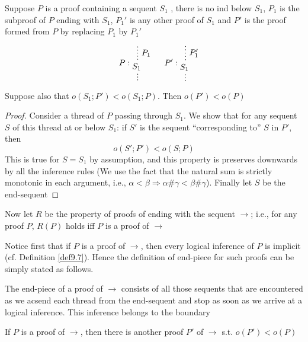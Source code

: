 \documentclass[11pt]{article}
\begin{document}
\begin{enumerate}
\begin{lemma}[]
\label{lemma12.7}
Suppose \(P\) is a proof containing a sequent \(S_1\) , there is no ind below \(S_1\), \(P_1\)
is the subproof of \(P\) ending with \(S_1\), \(P_1'\) is any other proof of \(S_1\)
and \(P'\) is the proof formed from \(P\) by replacing \(P_1\) by \(P_1'\)
  \begin{equation*}
P:
\begin{prooftree}%
\hypo{}
\ellipsis{\(P_1\)}{S_1}
\ellipsis{}{}
\end{prooftree}\hspace{1cm}
P':
\begin{prooftree}%
\hypo{}
\ellipsis{\(P_1'\)}{S_1}
\ellipsis{}{}
\end{prooftree}
  \end{equation*}
Suppose also that \(o(S_1;P')<o(S_1;P)\). Then \(o(P')<o(P)\)
\end{lemma}

\begin{proof}
Consider a thread of \(P\) passing through \(S_1\). We show that for any sequent \(S\) of this
thread at or below \(S_1\): if \(S'\) is the sequent ``corresponding to'' \(S\) in \(P'\), then
  \begin{equation*}
o(S';P')<o(S;P)
  \end{equation*}
This is true for \(S=S_1\) by assumption, and this property is preserves downwards by all the
inference rules (We use the fact that the natural sum is strictly monotonic in each argument,
i.e., \(\alpha<\beta\Rightarrow\alpha\#\gamma<\beta\#\gamma\)). Finally let \(S\) be the end-sequent
\end{proof}

Now let \(R\) be the property of proofs of ending with the sequent \(\to\); i.e., for any
proof \(P\), \(R(P)\) holds iff \(P\) is a proof of \(\to\)

Notice first that if \(P\) is a proof of \(\to\), then every logical inference of \(P\) is
implicit (cf. Definition \ref{def9.7}). Hence the definition of end-piece for such proofs can be
simply stated as follows.

The end-piece of a proof of \(\to\) consists of all those sequents that are encountered as we
acsend each thread from the end-sequent and stop as soon as we arrive at a logical inference.
This inference belongs to the boundary

\begin{lemma}[]
If \(P\) is a proof of \(\to\), then there is another proof \(P'\) of \(\to\) s.t. \(o(P')<o(P)\)
\end{lemma}


\end{enumerate}
\end{document}

